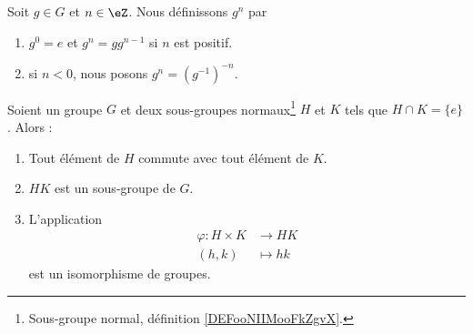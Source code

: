 \begin{definition}
	Soit \( g\in G\) et \( n\in \eZ\). Nous définissons \( g^n\) par
	\begin{enumerate}
		\item
		      \( g^0=e\) et \( g^n=gg^{n-1}\) si \( n\) est positif.
		\item
		      si \( n<0\), nous posons \( g^n=(g^{-1})^{-n}\).
	\end{enumerate}
\end{definition}



\begin{lemma}\label{LemHUkMxp}
	Soient un groupe \( G\) et deux sous-groupes normaux\footnote{Sous-groupe normal, définition \ref{DEFooNIIMooFkZgvX}.} \( H\) et \( K\) tels que \( H\cap K=\{ e \}\). Alors :
	\begin{enumerate}
		\item       \label{ITEMooDFVBooSnnlgR}
		      Tout élément de \( H\) commute avec tout élément de \( K\).
		\item       \label{ITEMooVVBGooZSJqjp}
		      \( HK\) est un sous-groupe de \( G\).
		\item       \label{IMTEooPCBZooQoZFOD}
		      L'application
		      \begin{equation}
			      \begin{aligned}
				      \varphi\colon H\times K & \to HK     \\
				      (h,k)                   & \mapsto hk
			      \end{aligned}
		      \end{equation}
		      est un isomorphisme de groupes.
	\end{enumerate}
\end{lemma}

